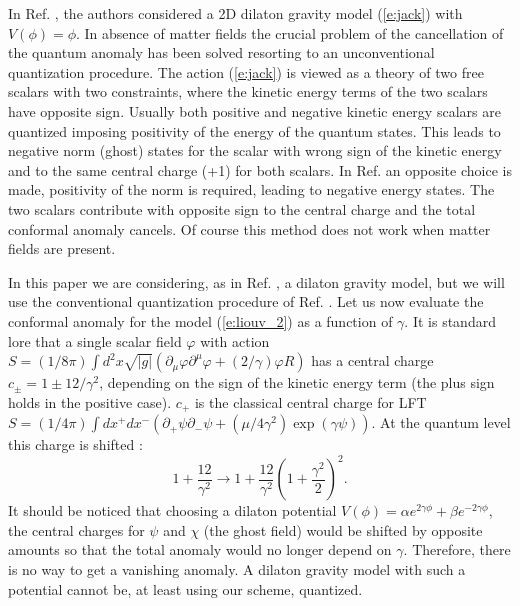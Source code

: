 \documentclass[a4paper,aps,prd,twocolumn,groupedaddress]{revtex4}
\begin{document}
In Ref. \cite{jack}, the authors considered a 2D dilaton gravity model
(\ref{e:jack}) with $V(\phi)=\phi$.  In absence of matter fields the
crucial problem of the cancellation of the quantum anomaly has been
solved resorting to an unconventional quantization procedure.  The
action (\ref{e:jack}) is viewed as a theory of two free scalars with
two constraints, where the kinetic energy terms of the two scalars
have opposite sign.  Usually both positive and negative kinetic energy
scalars are quantized imposing positivity of the energy of the quantum
states. This leads to negative norm (ghost) states for the scalar with
wrong sign of the kinetic energy and to the same central charge (+1)
for both scalars. In Ref. \cite{jack} an opposite choice is made,
positivity of the norm is required, leading to negative energy
states. The two scalars contribute with opposite sign to the central
charge and the total conformal anomaly cancels. Of course this method
does not work when matter fields are present.

In this paper we are considering, as in Ref.  \cite{jack}, a dilaton
gravity model, but we will use the conventional quantization procedure
of Ref. \cite{kawai}.  Let us now evaluate the conformal anomaly for
the model (\ref{e:liouv_2}) as a function of $\gamma$. It is standard
lore that a single scalar field $\varphi$ with action $S=(1/8\pi)\int
d^2x \sqrt{|g|}(\partial_\mu\varphi\partial^\mu\varphi
+(2/\gamma)\varphi R)$ has a central charge $c_\pm=1\pm12/\gamma^2$,
depending on the sign of the kinetic energy term (the plus sign holds
in the positive case). $c_+$ is the classical central charge for LFT
$S=(1/4\pi)\int dx^+dx^- (\partial_+\psi\partial_-\psi
+(\mu/4\gamma^2)\exp(\gamma\psi))$. At the quantum level this charge
is shifted \cite{thorn}:
\begin{equation}\label{e:shift}
1+\frac{12}{\gamma^2} \to
1+\frac{12}{\gamma^2}\left(1+\frac{\gamma^2}{2}\right)^2.
\end{equation}
It should be noticed that choosing a dilaton potential $V(\phi)=\alpha
e^{2\gamma\phi}+\beta e^{-2\gamma\phi}$, the central charges for
$\psi$ and $\chi$ (the ghost field) would be shifted by opposite
amounts so that the total anomaly would no longer depend on $\gamma$.
Therefore, there is no way to get  a vanishing anomaly.
A dilaton gravity model with such a potential cannot be, at least 
using our scheme,  quantized.  
\end{document}
